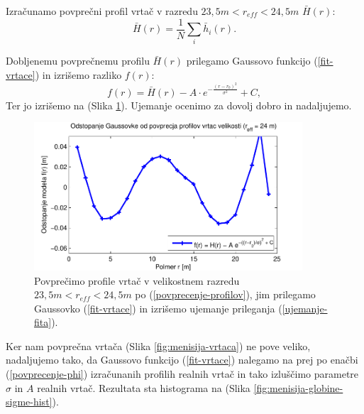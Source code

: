 \documentclass[a4paper, twoside, 12pt]{book}
\begin{document}
Izračunamo povprečni profil vrtač v razredu $23,5m < r_{eff} < 24,5m$ $\bar H (r)$:
\begin{equation} 
  \bar H(r) = \frac{1}{N} \sum_{i} \bar h_i(r).
  \label{povprecenje-profilov}
\end{equation}

Dobljenemu povprečnemu profilu $\bar H(r)$ prilegamo Gaussovo funkcijo (\ref{fit-vrtace}) in izrišemo razliko $f(r)$:
\begin{equation}
  f(r) = \bar{H}(r) - A \cdot e^{-\frac{(r-r_0)^2}{\sigma^2}} + C,
  \label{ujemanje-fita}
\end{equation}
Ter jo izrišemo na (Slika \ref{fig:menisija-profil-21-fit}). Ujemanje ocenimo za dovolj dobro in nadaljujemo.

  \begin{figure}[h!]
    \begin{center}
      \includegraphics[width=10cm]{slike/menisija-profil-21-fit}
    \end{center}
    \caption{Povprečimo profile vrtač v velikostnem razredu $23,5m < r_{eff} < 24,5m$ po (\ref{povprecenje-profilov}), jim prilegamo Gaussovko (\ref{fit-vrtace}) in izrišemo ujemanje prileganja (\ref{ujemanje-fita}).}
    \label{fig:menisija-profil-21-fit}
  \end{figure}

Ker nam povprečna vrtača (Slika \ref{fig:menisija-vrtaca}) ne pove veliko, nadaljujemo tako, da Gaussovo funkcijo (\ref{fit-vrtace}) nalegamo na prej po enačbi (\ref{povprecenje-phi}) izračunanih profilih realnih vrtač in tako izluščimo parametre $\sigma$ in $A$ realnih vrtač.
Rezultata sta histograma na (Slika \ref{fig:menisija-globine-sigme-hist}).
\end{document}
